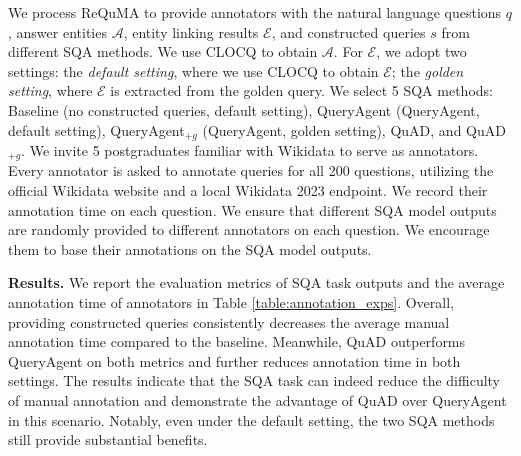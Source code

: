 \documentclass[runningheads]{llncs}
\begin{document}
We process ReQuMA to provide annotators with the natural language questions $q$, answer entities $\mathcal{A}$, entity linking results $\mathcal{E}$, and constructed queries $s$ from different SQA methods.
We use CLOCQ \cite{christmann2022beyond} to obtain $\mathcal{A}$. 
For $\mathcal{E}$, we adopt two settings: the \textit{default setting}, where we use CLOCQ to obtain $\mathcal{E}$; the \textit{golden setting}, where $\mathcal{E}$ is extracted from the golden query.
We select 5 SQA methods: Baseline (no constructed queries, default setting), QueryAgent (QueryAgent, default setting), QueryAgent$_{+g}$ (QueryAgent, golden setting), QuAD, and QuAD$_{+g}$.
We invite 5 postgraduates familiar with Wikidata to serve as annotators. Every annotator is asked to annotate queries for all 200 questions, utilizing the official Wikidata website and a local Wikidata 2023 endpoint. We record their annotation time on each question.
We ensure that different SQA model outputs are randomly provided to different annotators on each question. We encourage them to base their annotations on the SQA model outputs.


\noindent\textbf{Results.}
We report the evaluation metrics of SQA task outputs and the average annotation time of annotators in Table \ref{table:annotation_exps}.
Overall, providing constructed queries consistently decreases the average manual annotation time compared to the baseline.
Meanwhile, QuAD outperforms QueryAgent on both metrics and further reduces annotation time in both settings. 
The results indicate that the SQA task can indeed reduce the difficulty of manual annotation and demonstrate the advantage of QuAD over QueryAgent in this scenario. Notably, even under the default setting, the two SQA methods still provide substantial benefits. 
\end{document}
